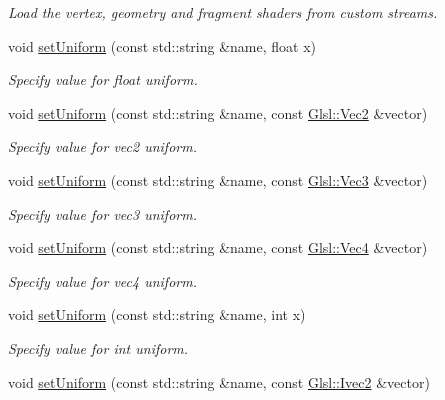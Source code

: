 \begin{DoxyCompactItemize}
\begin{DoxyCompactList}\small\item\em Load the vertex, geometry and fragment shaders from custom streams. \end{DoxyCompactList}\item 
void \mbox{\hyperlink{classsf_1_1_shader_abf78e3bea1e9b0bab850b6b0a0de29c7}{set\+Uniform}} (const std\+::string \&name, float x)
\begin{DoxyCompactList}\small\item\em Specify value for {\ttfamily float} uniform. \end{DoxyCompactList}\item 
void \mbox{\hyperlink{classsf_1_1_shader_a4a2c673c41e37b17d67e4af1298b679f}{set\+Uniform}} (const std\+::string \&name, const \mbox{\hyperlink{namespacesf_1_1_glsl_adeed356d346d87634b4c197a530e4edf}{Glsl\+::\+Vec2}} \&vector)
\begin{DoxyCompactList}\small\item\em Specify value for {\ttfamily vec2} uniform. \end{DoxyCompactList}\item 
void \mbox{\hyperlink{classsf_1_1_shader_aad654ad8de6f0c56191fa7b8cea21db2}{set\+Uniform}} (const std\+::string \&name, const \mbox{\hyperlink{namespacesf_1_1_glsl_a9bdd0463b7cb5316244a082007bd50f0}{Glsl\+::\+Vec3}} \&vector)
\begin{DoxyCompactList}\small\item\em Specify value for {\ttfamily vec3} uniform. \end{DoxyCompactList}\item 
void \mbox{\hyperlink{classsf_1_1_shader_abc1aee8343800680fd62e1f3d43c24bf}{set\+Uniform}} (const std\+::string \&name, const \mbox{\hyperlink{structsf_1_1priv_1_1_vector4}{Glsl\+::\+Vec4}} \&vector)
\begin{DoxyCompactList}\small\item\em Specify value for {\ttfamily vec4} uniform. \end{DoxyCompactList}\item 
void \mbox{\hyperlink{classsf_1_1_shader_ae4fc8b4c18e6b653952bce5c8c81e4a0}{set\+Uniform}} (const std\+::string \&name, int x)
\begin{DoxyCompactList}\small\item\em Specify value for {\ttfamily int} uniform. \end{DoxyCompactList}\item 
void \mbox{\hyperlink{classsf_1_1_shader_a2ccb5bae59cedc7d6a9b533c97f7d1ed}{set\+Uniform}} (const std\+::string \&name, const \mbox{\hyperlink{namespacesf_1_1_glsl_aab803ee70c4b7bfcd63ec09e10408fd3}{Glsl\+::\+Ivec2}} \&vector)

\end{DoxyCompactItemize}
